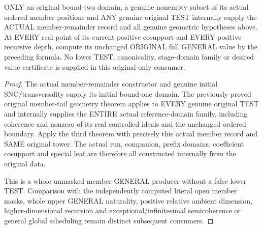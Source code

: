 \begin{theorem}
\label{hir:original-only-positive-member-untested-curve-full-values}
\leanok
ONLY an original bound-two domain, a genuine nonempty subset of its actual
ordered member positions and ANY genuine original TEST internally supply the
ACTUAL member-remainder record and all genuine geometric hypotheses above.
At EVERY real point of its current positive cosupport and EVERY positive
recursive depth, compute its unchanged ORIGINAL full GENERAL value by the
preceding formula. No lower TEST, canonicality, stage-domain family or desired
value certificate is supplied in this original-only consumer.
\end{theorem}
\begin{proof}
The actual member-remainder constructor and genuine initial SNC/transversality
supply its initial bound-one domain. The previously proved original member-tail
geometry theorem applies to EVERY genuine original TEST and internally supplies
the ENTIRE actual reference-domain family, including coherence and nonzero of
its real controlled ideals and the unchanged ordered boundary. Apply the third
theorem with precisely this actual member record and SAME original tower.
The actual run, companion, prefix domains, coefficient cosupport and special
leaf are therefore all constructed internally from the original data.

This is a whole unmasked member GENERAL producer without a false lower TEST.
Comparison with the independently computed literal open member masks,
whole upper GENERAL naturality, positive relative ambient dimension,
higher-dimensional recursion and exceptional/infinitesimal semicoherence or
general global scheduling remain distinct subsequent consumers.
\end{proof}
